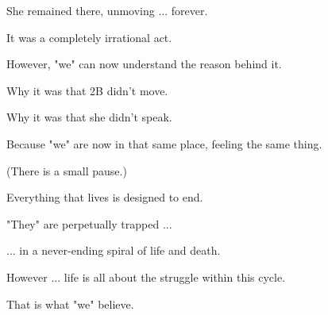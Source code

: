\begin{play}
	  She remained there, unmoving ... forever.
	
	  It was a completely irrational act.
	
	  However, "we" can now understand the reason behind it.
	
	  Why it was that 2B didn't move.
	
	  Why it was that she didn't speak.
	
	  Because "we" are now in that same place, feeling the same thing.
	
	(There is a small pause.)
	
	  Everything that lives is designed to end.
	
	  "They" are perpetually trapped ...
	
	  ... in a never-ending spiral of life and death.
	
	  However ... life is all about the struggle within this cycle.
	
	  That is what "we" believe. 	
\end{play}